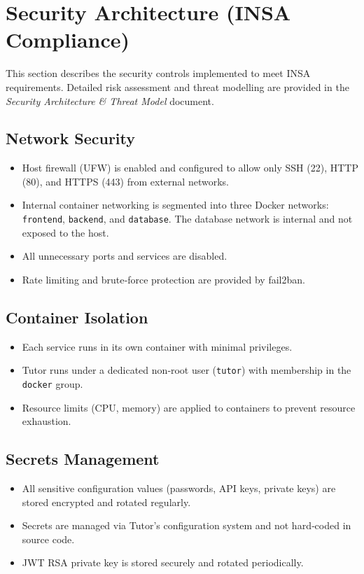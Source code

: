 \section{Security Architecture (INSA Compliance)}
This section describes the security controls implemented to meet INSA requirements. Detailed risk assessment and threat modelling are provided in the \textit{Security Architecture \& Threat Model} document.

\subsection{Network Security}
\begin{itemize}
    \item Host firewall (UFW) is enabled and configured to allow only SSH (22), HTTP (80), and HTTPS (443) from external networks.
    \item Internal container networking is segmented into three Docker networks: \texttt{frontend}, \texttt{backend}, and \texttt{database}. The database network is internal and not exposed to the host.
    \item All unnecessary ports and services are disabled.
    \item Rate limiting and brute‑force protection are provided by fail2ban.
\end{itemize}

\subsection{Container Isolation}
\begin{itemize}
    \item Each service runs in its own container with minimal privileges.
    \item Tutor runs under a dedicated non‑root user (\texttt{tutor}) with membership in the \texttt{docker} group.
    \item Resource limits (CPU, memory) are applied to containers to prevent resource exhaustion.
\end{itemize}

\subsection{Secrets Management}
\begin{itemize}
    \item All sensitive configuration values (passwords, API keys, private keys) are stored encrypted and rotated regularly.
    \item Secrets are managed via Tutor's configuration system and not hard‑coded in source code.
    \item JWT RSA private key is stored securely and rotated periodically.
\end{itemize}

